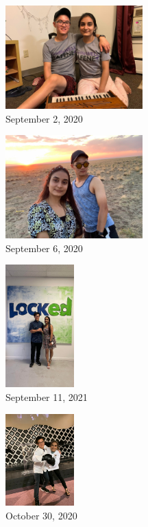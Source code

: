\documentclass[
]{book}
\begin{document}
\begin{figure}
\centering
\includegraphics[width=2.08333in,height=\textheight]{mimages/1 9-2-2020.jpg}
\caption{September 2, 2020}
\end{figure}

\begin{figure}
\centering
\includegraphics[width=2.08333in,height=\textheight]{mimages/2 9-6-2020.jpg}
\caption{September 6, 2020}
\end{figure}

\begin{figure}
\centering
\includegraphics[width=1.04167in,height=\textheight]{mimages/13 9-11-2021.jpg}
\caption{September 11, 2021}
\end{figure}

\begin{figure}
\centering
\includegraphics[width=1.04167in,height=\textheight]{mimages/4 10-30-2020.jpg}
\caption{October 30, 2020}
\end{figure}
\end{document}
